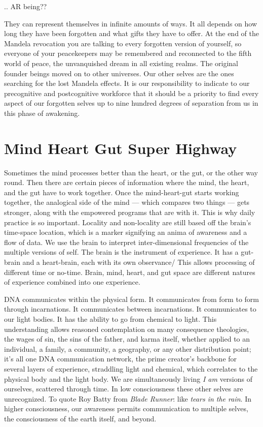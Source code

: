 \documentclass[letterpaper,9pt,twoside,titlepage,onecolumn,openany]{book}
\begin{document}
.. AR being??

They can represent themselves in infinite amounts of ways. It all
depends on how long they have been forgotten and what gifts they have to
offer. At the end of the Mandela revocation you are talking to every
forgotten version of yourself, so everyone of your peacekeepers may be
remembered and reconnected to the fifth world of peace, the unvanquished
dream in all existing realms. The original founder beings moved on to
other universes. Our other selves are the ones searching for the lost
Mandela effects. It is our responsibility to indicate to our
precognitive and postcognitive workforce that it should be a priority to
find every aspect of our forgotten selves up to nine hundred degrees of
separation from us in this phase of awakening.

\section*{Mind Heart Gut Super
Highway}\label{mind-heart-gut-super-highway}

Sometimes the mind processes better than the heart, or the gut, or the
other way round. Then there are certain pieces of information where the
mind, the heart, and the gut have to work together. Once the
mind-heart-gut starts working together, the analogical side of the mind
--- which compares two things --- gets stronger, along with the
empowered programs that are with it. This is why daily practice is so
important. Locality and non-locality are still based off the brain's
time-space location, which is a marker signifying an anima of awareness
and a flow of data. We use the brain to interpret inter-dimensional
frequencies of the multiple versions of self. The brain is the
instrument of experience. It has a gut-brain and a heart-brain, each
with its own observance/ This allows processing of different time or
no-time. Brain, mind, heart, and gut space are different natures of
experience combined into one experience.

DNA communicates within the physical form. It communicates from form to
form through incarnations. It communicates between incarnations. It
communicates to our light bodies. It has the ability to go from chemical
to light. This understanding allows reasoned contemplation on many
consequence theologies, the wages of sin, the sins of the father, and
karma itself, whether applied to an individual, a family, a community, a
geography, or any other distribution point; it's all one DNA
communication network, the prime creator's backbone for several layers
of experience, straddling light and chemical, which correlates to the
physical body and the light body. We are simultaneously living \emph{I
am} versions of ourselves, scattered through time. In low consciousness
these other selves are unrecognized. To quote Roy Batty from \emph{Blade
Runner}: like \emph{tears in the rain}. In higher consciousness, our
awareness permits communication to multiple selves, the consciousness of
the earth itself, and beyond.
\end{document}
